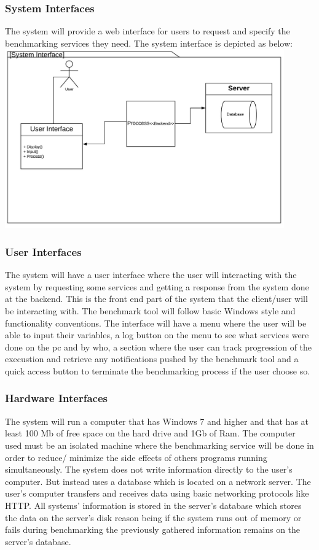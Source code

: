 \documentclass[a4paper,12pt]{article}
\begin{document}
\subsubsection{System Interfaces}
The system will provide a web interface for users to request and specify the benchmarking services they need. The system interface is depicted as below:\\
\includegraphics[width=12cm]{SI.jpeg}
\subsubsection{User Interfaces}
The system will have a user interface where the user will interacting with the system by requesting some services and getting a response from the system done at the backend. This is the front end part of the system that the client/user will be interacting with. The benchmark tool will follow basic Windows style and functionality conventions. The interface will have a menu where the user will be able to input their variables, a log button on the menu to see what services were done on the pc and by who, a section where the user can track progression of the execustion and retrieve any notifications pushed by the benchmark tool and a quick access button to terminate the benchmarking process if the user choose so. 
\subsubsection{Hardware Interfaces}
The system will run a computer that has Windows 7 and higher and that has at least 100 Mb of free space on the hard drive and 1Gb of Ram. The computer used must be an isolated machine where the benchmarking service will be done in order to reduce/ minimize the side effects of others programs running simultaneously. The system does not write information directly to the user's computer. But instead uses a database which is located on a network server. The user's computer transfers and receives data using basic networking protocols like HTTP. All systems' information is stored in the server's database which stores the data on the server's disk reason being if the system runs out of memory or fails during benchmarking the previously gathered information remains on the server's database.
\end{document}
